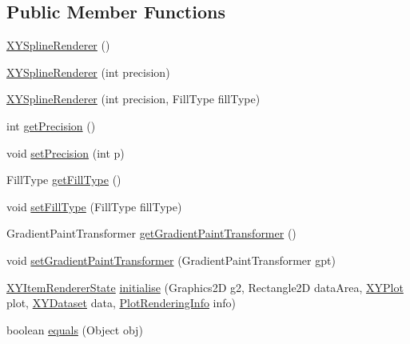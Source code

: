 \subsection*{Public Member Functions}
\begin{DoxyCompactItemize}
\item 
\mbox{\hyperlink{classorg_1_1jfree_1_1chart_1_1renderer_1_1xy_1_1_x_y_spline_renderer_a5978e801cbd9410f9a8a3dd3b9373270}{X\+Y\+Spline\+Renderer}} ()
\item 
\mbox{\hyperlink{classorg_1_1jfree_1_1chart_1_1renderer_1_1xy_1_1_x_y_spline_renderer_aafb3c50508729ba7a60a56030eb39e6f}{X\+Y\+Spline\+Renderer}} (int precision)
\item 
\mbox{\hyperlink{classorg_1_1jfree_1_1chart_1_1renderer_1_1xy_1_1_x_y_spline_renderer_a98712b59a210f1357a4e953b41d22fef}{X\+Y\+Spline\+Renderer}} (int precision, Fill\+Type fill\+Type)
\item 
int \mbox{\hyperlink{classorg_1_1jfree_1_1chart_1_1renderer_1_1xy_1_1_x_y_spline_renderer_ae6162076ed27c60c0d1c4732cb8fd218}{get\+Precision}} ()
\item 
void \mbox{\hyperlink{classorg_1_1jfree_1_1chart_1_1renderer_1_1xy_1_1_x_y_spline_renderer_aa54676920444e2e4dddd54b1684bd752}{set\+Precision}} (int p)
\item 
Fill\+Type \mbox{\hyperlink{classorg_1_1jfree_1_1chart_1_1renderer_1_1xy_1_1_x_y_spline_renderer_ac8308a012d30b632a3a9c7b7627463a8}{get\+Fill\+Type}} ()
\item 
void \mbox{\hyperlink{classorg_1_1jfree_1_1chart_1_1renderer_1_1xy_1_1_x_y_spline_renderer_a16c1c2cd076dc8d74b6c0aa24de3bdaa}{set\+Fill\+Type}} (Fill\+Type fill\+Type)
\item 
Gradient\+Paint\+Transformer \mbox{\hyperlink{classorg_1_1jfree_1_1chart_1_1renderer_1_1xy_1_1_x_y_spline_renderer_ae16c4cea416913f19ce54d537ed4d341}{get\+Gradient\+Paint\+Transformer}} ()
\item 
void \mbox{\hyperlink{classorg_1_1jfree_1_1chart_1_1renderer_1_1xy_1_1_x_y_spline_renderer_a8c5699db193f3d55ce98d9339a8fc676}{set\+Gradient\+Paint\+Transformer}} (Gradient\+Paint\+Transformer gpt)
\item 
\mbox{\hyperlink{classorg_1_1jfree_1_1chart_1_1renderer_1_1xy_1_1_x_y_item_renderer_state}{X\+Y\+Item\+Renderer\+State}} \mbox{\hyperlink{classorg_1_1jfree_1_1chart_1_1renderer_1_1xy_1_1_x_y_spline_renderer_a24e7736ad02022e42ee70454389c7f69}{initialise}} (Graphics2D g2, Rectangle2D data\+Area, \mbox{\hyperlink{classorg_1_1jfree_1_1chart_1_1plot_1_1_x_y_plot}{X\+Y\+Plot}} plot, \mbox{\hyperlink{interfaceorg_1_1jfree_1_1data_1_1xy_1_1_x_y_dataset}{X\+Y\+Dataset}} data, \mbox{\hyperlink{classorg_1_1jfree_1_1chart_1_1plot_1_1_plot_rendering_info}{Plot\+Rendering\+Info}} info)
\item 
boolean \mbox{\hyperlink{classorg_1_1jfree_1_1chart_1_1renderer_1_1xy_1_1_x_y_spline_renderer_a9b3c00cac5e2e95733e4bcf66da5e679}{equals}} (Object obj)
\end{DoxyCompactItemize}
